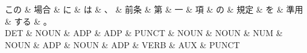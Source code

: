 \documentclass[tikz,border=5pt]{standalone}
\begin{document}
\normalsize
\begin{dependency}[edge unit distance=12.0pt]
    \begin{deptext}[column sep=1em]
        この \& 場合 \& に \& は \& 、 \& 前条 \& 第 \& 一 \& 項 \& の \& 規定 \& を \& 準用 \& する \& 。\\
        DET \& NOUN \& ADP \& ADP \& PUNCT \& NOUN \& NOUN \& NUM \& NOUN \& ADP \& NOUN \& ADP \& VERB \& AUX \& PUNCT\\
    \end{deptext}
\end{dependency}
\end{document}
